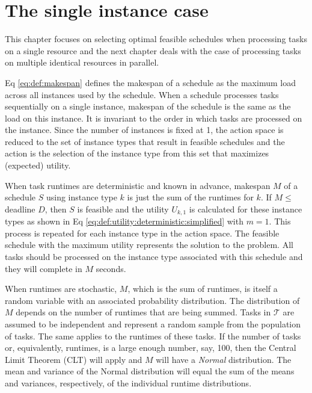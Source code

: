 \documentclass[12pt]{report}
\begin{document}
\chapter{The single instance case}

This chapter focuses on selecting optimal feasible schedules when processing tasks on a single resource and the next chapter deals with the case of processing tasks on multiple identical resources in parallel.

Eq \ref{eq:def:makespan} defines the makespan of a schedule as the maximum load across all instances used by the schedule.
When a schedule processes tasks sequentially on a single instance, makespan of the schedule is the same as the load on this instance.
It is invariant to the order in which tasks are processed on the instance.
Since the number of instances is fixed at 1, the action space is reduced to the set of instance types that result in feasible schedules and the action is the selection of the instance type from this set that maximizes (expected) utility.

When task runtimes are deterministic and known in advance, makespan $M$ of a schedule $S$ using instance type $k$ is just the sum of the runtimes for $k$.
If $M \le $ deadline $D$, then $S$ is feasible and the utility $U_{k,1}$ is calculated for these instance types as shown in Eq \ref{eq:def:utility:deterministic:simplified} with $m=1$.
This process is repeated for each instance type in the action space.
The feasible schedule with the maximum utility represents the solution to the problem.
All tasks should be processed on the instance type associated with this schedule and they will complete in $M$ seconds.

When runtimes are stochastic, $M$, which is the sum of runtimes, is itself a random variable with an associated probability distribution.
The distribution of $M$ depends on the number of runtimes that are being summed.
Tasks in $\mathcal{T}$ are assumed to be independent and represent a random sample from the population of tasks.
The same applies to the runtimes of these tasks.
If the number of tasks or, equivalently, runtimes, is a large enough number, say, 100, then the Central Limit Theorem (CLT) will apply and $M$ will have a \textit{Normal} distribution.
The mean and variance of the Normal distribution will equal the sum of the means and variances, respectively, of the individual runtime distributions.
\end{document}
